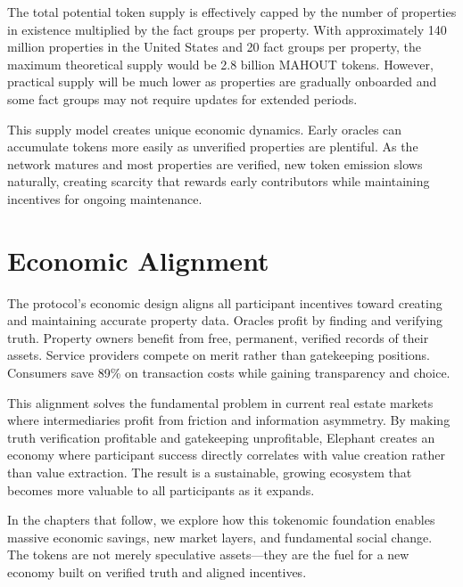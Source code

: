 The total potential token supply is effectively capped by the number of properties in existence multiplied by the fact groups per property. With approximately 140 million properties in the United States and 20 fact groups per property, the maximum theoretical supply would be 2.8 billion MAHOUT tokens. However, practical supply will be much lower as properties are gradually onboarded and some fact groups may not require updates for extended periods.

This supply model creates unique economic dynamics. Early oracles can accumulate tokens more easily as unverified properties are plentiful. As the network matures and most properties are verified, new token emission slows naturally, creating scarcity that rewards early contributors while maintaining incentives for ongoing maintenance.

\section{Economic Alignment}

The protocol's economic design aligns all participant incentives toward creating and maintaining accurate property data. Oracles profit by finding and verifying truth. Property owners benefit from free, permanent, verified records of their assets. Service providers compete on merit rather than gatekeeping positions. Consumers save 89\% on transaction costs while gaining transparency and choice.

This alignment solves the fundamental problem in current real estate markets where intermediaries profit from friction and information asymmetry. By making truth verification profitable and gatekeeping unprofitable, Elephant creates an economy where participant success directly correlates with value creation rather than value extraction. The result is a sustainable, growing ecosystem that becomes more valuable to all participants as it expands.

In the chapters that follow, we explore how this tokenomic foundation enables massive economic savings, new market layers, and fundamental social change. The tokens are not merely speculative assets—they are the fuel for a new economy built on verified truth and aligned incentives.